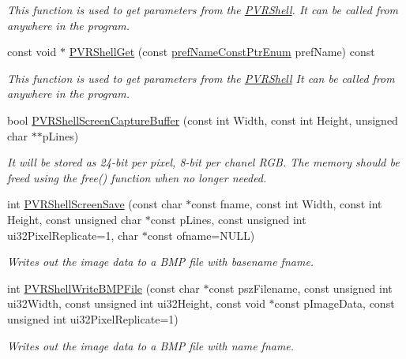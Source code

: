 \begin{DoxyCompactItemize}
\begin{DoxyCompactList}\small\item\em This function is used to get parameters from the \hyperlink{class_p_v_r_shell}{P\+V\+R\+Shell}. It can be called from anywhere in the program. \end{DoxyCompactList}\item 
const void $\ast$ \hyperlink{class_p_v_r_shell_ab7c61e96dc4077da2f8663cdbc6f70ba}{P\+V\+R\+Shell\+Get} (const \hyperlink{_p_v_r_shell_8h_af13725186b1491b5d72cd42920b7bc73}{pref\+Name\+Const\+Ptr\+Enum} pref\+Name) const 
\begin{DoxyCompactList}\small\item\em This function is used to get parameters from the \hyperlink{class_p_v_r_shell}{P\+V\+R\+Shell} It can be called from anywhere in the program. \end{DoxyCompactList}\item 
bool \hyperlink{class_p_v_r_shell_acdac895c92c15a2d7731ff1346ed4a89}{P\+V\+R\+Shell\+Screen\+Capture\+Buffer} (const int Width, const int Height, unsigned char $\ast$$\ast$p\+Lines)
\begin{DoxyCompactList}\small\item\em It will be stored as 24-\/bit per pixel, 8-\/bit per chanel R\+G\+B. The memory should be freed using the free() function when no longer needed. \end{DoxyCompactList}\item 
int \hyperlink{class_p_v_r_shell_a9e7da8da656a1d4c68dd1b1b7ae0f428}{P\+V\+R\+Shell\+Screen\+Save} (const char $\ast$const fname, const int Width, const int Height, const unsigned char $\ast$const p\+Lines, const unsigned int ui32\+Pixel\+Replicate=1, char $\ast$const ofname=N\+U\+L\+L)
\begin{DoxyCompactList}\small\item\em Writes out the image data to a B\+M\+P file with basename fname. \end{DoxyCompactList}\item 
int \hyperlink{class_p_v_r_shell_a383dfb6f48765bdcaffed9076e00b3ca}{P\+V\+R\+Shell\+Write\+B\+M\+P\+File} (const char $\ast$const psz\+Filename, const unsigned int ui32\+Width, const unsigned int ui32\+Height, const void $\ast$const p\+Image\+Data, const unsigned int ui32\+Pixel\+Replicate=1)
\begin{DoxyCompactList}\small\item\em Writes out the image data to a B\+M\+P file with name fname. \end{DoxyCompactList}\item 
$$
\end{DoxyCompactItemize}
